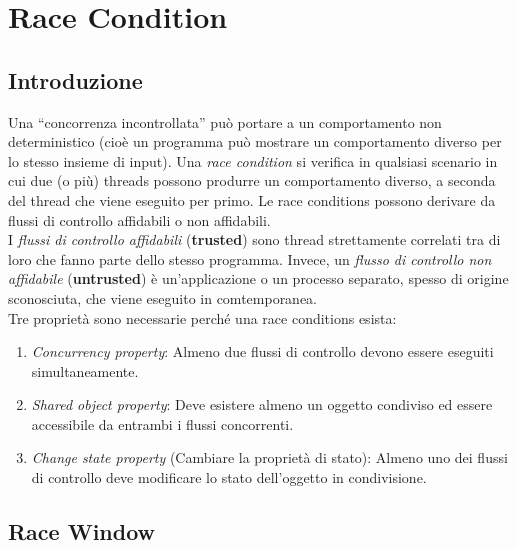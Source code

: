 \chapter{Race Condition}

\section{Introduzione}

Una “concorrenza incontrollata” può portare a un comportamento non deterministico
(cioè un programma può mostrare un comportamento diverso per lo stesso insieme
di input).
Una \textit{race condition} si verifica in qualsiasi scenario in cui due (o più)
threads possono
produrre un comportamento diverso, a seconda del thread che viene eseguito per primo.
Le race conditions possono derivare da flussi di controllo affidabili o non
affidabili.\\
I \textit{flussi di controllo affidabili} (\textbf{trusted}) sono thread
strettamente correlati tra di loro che fanno parte dello stesso programma.
Invece, un \textit{flusso di controllo non affidabile} (\textbf{untrusted})
è un'applicazione o un processo separato, spesso di origine sconosciuta,
che viene eseguito in comtemporanea.\\

Tre proprietà sono necessarie perché una race conditions esista:
\begin{enumerate}
    \item \textit{Concurrency property}: Almeno due flussi di controllo
          devono essere eseguiti simultaneamente.
    \item \textit{Shared object property}: Deve esistere almeno un oggetto
          condiviso ed
          essere accessibile da
          entrambi i flussi concorrenti.
    \item \textit{Change state property} (Cambiare la proprietà di stato):
          Almeno uno dei flussi di
          controllo deve modificare lo stato dell'oggetto in condivisione.
\end{enumerate}

\section{Race Window}

